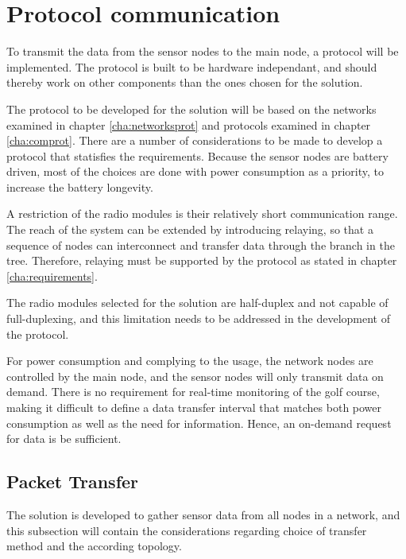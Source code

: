 \clearpage
\section{Protocol communication} \label{cha:protocolDesign}
To transmit the data from the sensor nodes to the main node, a protocol will be implemented. The protocol is built to be hardware independant, and should thereby work on other components than the ones chosen for the solution.

The protocol to be developed for the solution will be based on the networks examined in chapter \ref{cha:networksprot} and protocols examined in chapter \ref{cha:comprot}.
There are a number of considerations to be made to develop a protocol that statisfies the requirements.
Because the sensor nodes are battery driven, most of the choices are done with power consumption as a priority, to increase the battery longevity.

A restriction of the radio modules is their relatively short communication range. The reach of the system can be extended by introducing relaying, so that a sequence of nodes can interconnect and transfer data through the branch in the tree. Therefore, relaying must be supported by the protocol as stated in chapter \ref{cha:requirements}. 


The radio modules selected for the solution are half-duplex and not capable of full-duplexing, and this limitation needs to be addressed in the development of the protocol. 

For power consumption and complying to the usage, the network nodes are controlled by the main node, and the sensor nodes will only transmit data on demand. There is no requirement for real-time monitoring of the golf course, making it difficult to define a data transfer interval that matches both power consumption as well as the need for information.
Hence, an on-demand request for data is be sufficient.

\subsection{Packet Transfer}
The solution is developed to gather sensor data from all nodes in a network, and this subsection will contain the considerations regarding choice of transfer method and the according topology.

